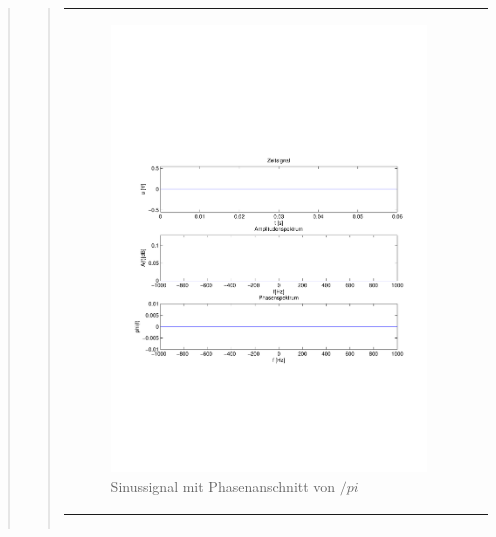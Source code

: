 \begin{quote}
\begin{quote}
\begin{center}
\begin{tabular}{ll}
            \hspace{-4em}
                \begin{minipage}{0.6\textwidth}

                    \begin{figure}[H]
                        \label{fig:}
                        \includegraphics[scale=0.5, trim = 2cm 7cm 1.5cm 8.5cm, clip]{./Bilder/Phasenanschnitt88pi.pdf} %
                        \caption{Sinussignal mit Phasenanschnitt von $/pi$}
                    \end{figure}

                \end{minipage}

            \end{tabular}
            \end{center}
             \begin{center}
                 \begin{tabular}{|c|c|c|}
                             

\end{tabular}
\end{center}
\end{quote}
\end{quote}
